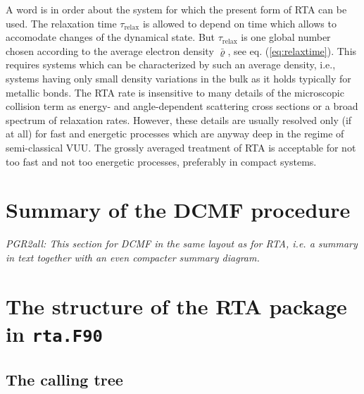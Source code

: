 \documentclass[final,1p]{elsarticle}
\newcommand{\PGRcomm}[1]{{\color{blue}\small\em PGR2all: #1}}
\begin{document}
A word is in order about the system for which the present form of RTA
can be used.  The relaxation time $\tau_\mathrm{relax}$ is allowed to
depend on time which allows to accomodate changes of the dynamical
state. But $\tau_\mathrm{relax}$ is one global number chosen according
to the average electron density $\bar{\varrho}$, see
eq. (\ref{eq:relaxtime}).  This requires systems which can be
characterized by such an average density, i.e., systems having only
small density variations in the bulk as it holds typically for
metallic bonds.  The RTA rate is insensitive to many details of the
microscopic collision term as energy- and angle-dependent scattering
cross sections \cite{Gig03a} or a broad spectrum of relaxation
rates. However, these details are usually resolved only (if at all)
for fast and energetic processes which are anyway deep in the regime
of semi-classical VUU. The grossly averaged treatment of RTA is
acceptable for not too fast and not too energetic processes,
preferably in compact systems.


\section{Summary of the DCMF procedure}
\label{sec:summaryDCMF}


\PGRcomm{This section for DCMF in the same layout as for RTA, i.e. a
  summary in text together with an even compacter summary diagram.}

\section{The structure of the RTA package in {\tt rta.F90}}
\label{eq:RTApack}

\subsection{The calling tree}
\label{eq:treeRTA}
\end{document}
